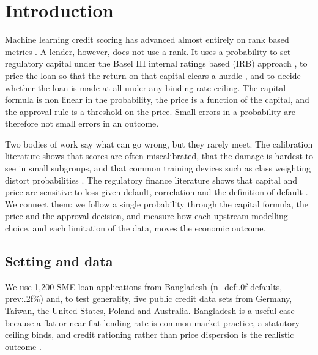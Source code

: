 \documentclass[11pt,a4paper]{article}
\begin{document}
\begin{abstract}
ones. In a stylised design, a partial credit guarantee that absorbs only unexpected loss restores BDT {{ul_incr:.0f}} million of credit at no expected fiscal outlay. All inputs, code and tables are reproducible from a single script chain.
\bigskip

\noindent\textbf{Keywords:} credit scoring; probability calibration; Basel III IRB; risk adjusted return on capital; SME finance; selection bias; emerging markets; Bangladesh.
\end{abstract}

\section{Introduction}
Machine learning credit scoring has advanced almost entirely on rank based metrics \citep{Khandani2010,Lessmann2015}. A lender, however, does not use a rank. It uses a probability to set regulatory capital under the Basel III internal ratings based (IRB) approach \citep{BCBS2017}, to price the loan so that the return on that capital clears a hurdle \citep{Repullo2004,Stoughton2007}, and to decide whether the loan is made at all under any binding rate ceiling. The capital formula is non linear in the probability, the price is a function of the capital, and the approval rule is a threshold on the price. Small errors in a probability are therefore not small errors in an outcome.

Two bodies of work say what can go wrong, but they rarely meet. The calibration literature shows that scores are often miscalibrated, that the damage is hardest to see in small subgroups, and that common training devices such as class weighting distort probabilities \citep{Guo2017,VanCalster2019,Roelofs2022,VanDenGoorbergh2022}. The regulatory finance literature shows that capital and price are sensitive to loss given default, correlation and the definition of default \citep{Tarashev2010,Witzany2008,Altman2005}. We connect them: we follow a single probability through the capital formula, the price and the approval decision, and measure how each upstream modelling choice, and each limitation of the data, moves the economic outcome.

\subsection{Setting and data}
We use 1{,}200 SME loan applications from Bangladesh ({{n_def:.0f}} defaults, {{prev:.2f}}\%) and, to test generality, five public credit data sets from Germany, Taiwan, the United States, Poland and Australia. Bangladesh is a useful case because a flat or near flat lending rate is common market practice, a statutory ceiling binds, and credit rationing rather than price dispersion is the realistic outcome \citep{Beck2006,Berger2006}.
\end{document}
